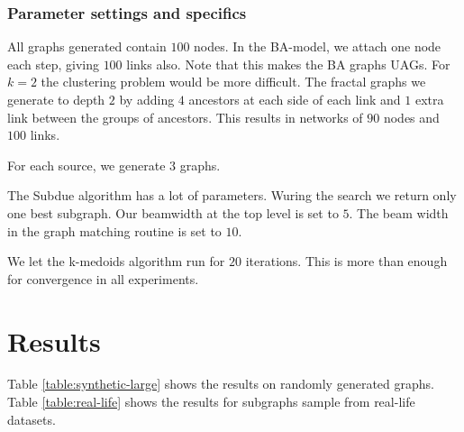 \documentclass{article}
\begin{document}
\subsubsection*{Parameter settings and specifics}

All graphs generated contain $100$ nodes. In the BA-model, we attach one node each step, giving $100$ links also. Note that this makes the BA graphs UAGs. For $k = 2$ the clustering problem would be more difficult. The fractal graphs we generate to depth $2$ by adding $4$ ancestors at each side of each link and $1$ extra link between the groups of ancestors. This results in networks of $90$ nodes and $100$ links.

For each source, we generate $3$ graphs.

The Subdue algorithm has a lot of parameters. Wuring the search we return only one best subgraph. Our beamwidth at the top level is set to $5$. The beam width in the graph matching routine is set to $10$.  

We let the k-medoids algorithm run for $20$ iterations. This is more than enough for convergence in all experiments. 

\section*{Results}

Table \ref{table:synthetic-large} shows the results on randomly generated graphs. Table \ref{table:real-life} shows the results for subgraphs sample from real-life datasets.  
\end{document}
